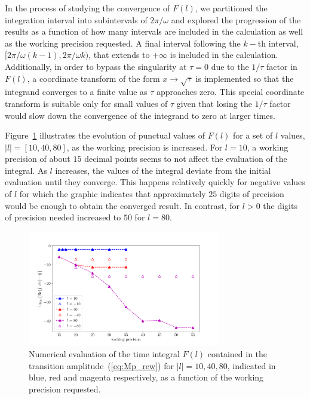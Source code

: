 In the process of studying the convergence of $F(l)$, we partitioned
the integration interval into subintervals of $2\pi/\omega$ and
explored the progression of the results as a function of how many
intervals are included in the calculation as well as the working
precision requested. A final interval following the $k-$th interval,
$[2\pi/\omega (k-1), 2\pi/\omega k)$, that extends to $+\infty$ is
  included in the calculation. Additionally, in order to bypass the
  singularity at $\tau = 0$ due to the $1/\tau$ factor in $F(l)$, a
  coordinate transform of the form $x \to \sqrt{\tau}$ is implemented
  so that the integrand converges to a finite value as $\tau$
  approaches zero. This special coordinate transform is suitable only
  for small values of $\tau$ given that losing the $1/\tau$ factor
  would slow down the convergence of the integrand to zero at larger
  times.



Figure~\ref{fig:WP_convergence} illustrates the evolution of punctual
values of $F(l)$ for a set of $l$ values, $|l| = [10, 40, 80]$, as the
working precision is increased. For $l=10$, a working precision of
about $15$ decimal points seems to not affect the evaluation of the
integral. As $l$ increases, the values of the integral deviate from
the initial evaluation until they converge. This happens relatively
quickly for negative values of $l$ for which the graphic indicates
that approximately $25$ digits of precision would be enough to obtain
the converged result. In contrast, for $l>0$ the digits of precision
needed increased to $50$ for $l = 80$.

\begin{figure}
  \centering
  \includegraphics[width=0.75\textwidth]{figures/ch_ATI_SFA/He/n512PG25MR35l_pm104080logRe}
  \caption{Numerical evaluation of the time integral $F(l)$ contained
    in the transition amplitude~(\ref{eq:Mp_rew}) for $|l| = 10, 40,
    80$, indicated in blue, red and magenta respectively, as a
    function of the working precision requested.}
  \label{fig:WP_convergence}
\end{figure}


